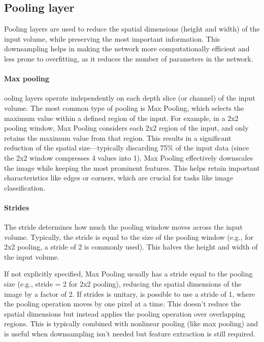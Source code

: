 \subsection{Pooling layer}
Pooling layers are used to reduce the spatial dimensions (height and width) of the input volume, while preserving the most important information. 
This downsampling helps in making the network more computationally efficient and less prone to overfitting, as it reduces the number of parameters in the network.

\paragraph*{Max pooling}
ooling layers operate independently on each depth slice (or channel) of the input volume. 
The most common type of pooling is Max Pooling, which selects the maximum value within a defined region of the input.
For example, in a 2x2 pooling window, Max Pooling considers each 2x2 region of the input, and only retains the maximum value from that region. 
This results in a significant reduction of the spatial size—typically discarding 75\% of the input data (since the 2x2 window compresses 4 values into 1).
Max Pooling effectively downscales the image while keeping the most prominent features. 
This helps retain important characteristics like edges or corners, which are crucial for tasks like image classification.

\paragraph*{Strides}
The stride determines how much the pooling window moves across the input volume. 
Typically, the stride is equal to the size of the pooling window (e.g., for 2x2 pooling, a stride of 2 is commonly used). 
This halves the height and width of the input volume.

If not explicitly specified, Max Pooling usually has a stride equal to the pooling size (e.g., stride = 2 for 2x2 pooling), reducing the spatial dimensions of the image by a factor of 2.
If strides is unitary, is possible to use a stride of 1, where the pooling operation moves by one pixel at a time. 
This doesn't reduce the spatial dimensions but instead applies the pooling operation over overlapping regions. 
This is typically combined with nonlinear pooling (like max pooling) and is useful when downsampling isn't needed but feature extraction is still required.

